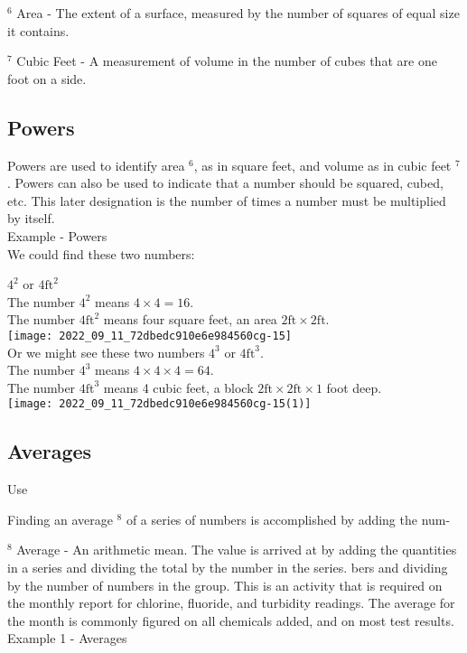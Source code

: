 ${ }^{6}$ Area - The extent of a surface, measured by the number of squares of equal size it contains.

${ }^{7}$ Cubic Feet - A measurement of volume in the number of cubes that are one foot on a side.

\subsection{Powers}
Powers are used to identify area ${ }^{6}$, as in square feet, and volume as in cubic feet ${ }^{7}$. Powers can also be used to indicate that a number should be squared, cubed, etc. This later designation is the number of times a number must be multiplied by itself.\\

Example - Powers\\

We could find these two numbers:

$4^{2}$ or $4 \mathrm{ft}^{2}$\\

The number $4^{2}$ means $4 \times 4=16$.\\

The number $4 \mathrm{ft}^{2}$ means four square feet, an area $2 \mathrm{ft} \times 2 \mathrm{ft}$.\\

\texttt{[image: 2022\_09\_11\_72dbedc910e6e984560cg-15]}\\

Or we might see these two numbers $4^{3}$ or $4 \mathrm{ft}^{3}$.\\

The number $4^{3}$ means $4 \times 4 \times 4=64$.\\

The number $4 \mathrm{ft}^{3}$ means 4 cubic feet, a block $2 \mathrm{ft} \times 2 \mathrm{ft} \times 1$ foot deep.\\

\texttt{[image: 2022\_09\_11\_72dbedc910e6e984560cg-15(1)]}\\

\subsection{Averages}
Use

Finding an average $^{8}$ of a series of numbers is accomplished by adding the num-

${ }^{8}$ Average - An arithmetic mean. The value is arrived at by adding the quantities in a series and dividing the total by the number in the series. bers and dividing by the number of numbers in the group. This is an activity that is required on the monthly report for chlorine, fluoride, and turbidity readings. The average for the month is commonly figured on all chemicals added, and on most test results. Example 1 - Averages

